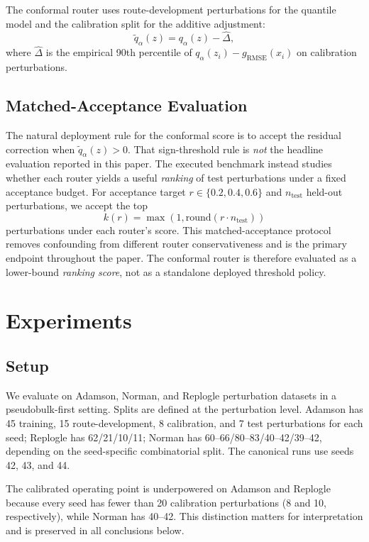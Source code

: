\documentclass{article}
\newcommand{\gain}{g_{\mathrm{RMSE}}}
\begin{document}
The conformal router uses route-development perturbations for the quantile model and the calibration split for the additive adjustment:
\begin{equation}
\tilde{q}_\alpha(z) = q_\alpha(z) - \hat{\Delta},
\end{equation}
where $\hat{\Delta}$ is the empirical 90th percentile of $q_\alpha(z_i)-\gain(x_i)$ on calibration perturbations.

\subsection{Matched-Acceptance Evaluation}
The natural deployment rule for the conformal score is to accept the residual correction when $\tilde{q}_\alpha(z)>0$. That sign-threshold rule is \emph{not} the headline evaluation reported in this paper. The executed benchmark instead studies whether each router yields a useful \emph{ranking} of test perturbations under a fixed acceptance budget. For acceptance target $r \in \{0.2,0.4,0.6\}$ and $n_{\mathrm{test}}$ held-out perturbations, we accept the top
\begin{equation}
k(r) = \max \left(1, \mathrm{round}(r \cdot n_{\mathrm{test}})\right)
\end{equation}
perturbations under each router's score. This matched-acceptance protocol removes confounding from different router conservativeness and is the primary endpoint throughout the paper. The conformal router is therefore evaluated as a lower-bound \emph{ranking score}, not as a standalone deployed threshold policy.

\section{Experiments}
\label{sec:experiments}
\subsection{Setup}
We evaluate on Adamson, Norman, and Replogle perturbation datasets in a pseudobulk-first setting. Splits are defined at the perturbation level. Adamson has 45 training, 15 route-development, 8 calibration, and 7 test perturbations for each seed; Replogle has 62/21/10/11; Norman has 60--66/80--83/40--42/39--42, depending on the seed-specific combinatorial split. The canonical runs use seeds 42, 43, and 44.

The calibrated operating point is underpowered on Adamson and Replogle because every seed has fewer than 20 calibration perturbations (8 and 10, respectively), while Norman has 40--42. This distinction matters for interpretation and is preserved in all conclusions below.
\end{document}
